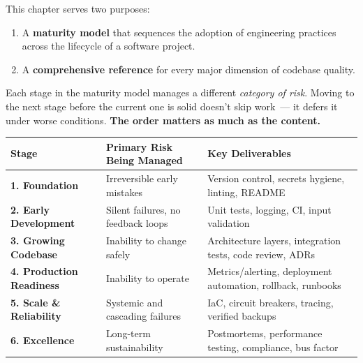 \label{writing-good-code:overview}

This chapter serves two purposes:

\begin{enumerate}
\def\labelenumi{\arabic{enumi}.}
\tightlist
\item
  A \textbf{maturity model} that sequences the adoption of engineering practices across the lifecycle of a software project.
\item
  A \textbf{comprehensive reference} for every major dimension of codebase quality.
\end{enumerate}

\noindent{}Each stage in the maturity model manages a different \emph{category of risk}. Moving to the next stage before the current one is solid doesn't skip work~--- it defers it under worse conditions. \textbf{The order matters as much as the content.}


\label{writing-good-code:the-complete-roadmap-at-a-glance}

{\def\LTcaptype{none} %
\begin{longtable}[]{@{}
  >{\raggedright\arraybackslash}p{}
  >{\raggedright\arraybackslash}p{}
  >{\raggedright\arraybackslash}p{}@{}}
\toprule\noalign{}
\begin{minipage}[b]{\linewidth}\raggedright
Stage
\end{minipage} & \begin{minipage}[b]{\linewidth}\raggedright
Primary Risk Being Managed
\end{minipage} & \begin{minipage}[b]{\linewidth}\raggedright
Key Deliverables
\end{minipage} \\
\midrule\noalign{}
\endhead
\bottomrule\noalign{}
\endlastfoot
\textbf{1. Foundation} & Irreversible early mistakes & Version control, secrets hygiene, linting, README \\
\textbf{2. Early Development} & Silent failures, no feedback loops & Unit tests, logging, CI, input validation \\
\textbf{3. Growing Codebase} & Inability to change safely & Architecture layers, integration tests, code review, ADRs \\
\textbf{4. Production Readiness} & Inability to operate & Metrics/alerting, deployment automation, rollback, runbooks \\
\textbf{5. Scale \& Reliability} & Systemic and cascading failures & IaC, circuit breakers, tracing, verified backups \\
\textbf{6. Excellence} & Long-term sustainability & Postmortems, performance testing, compliance, bus factor \\
\end{longtable}
}

